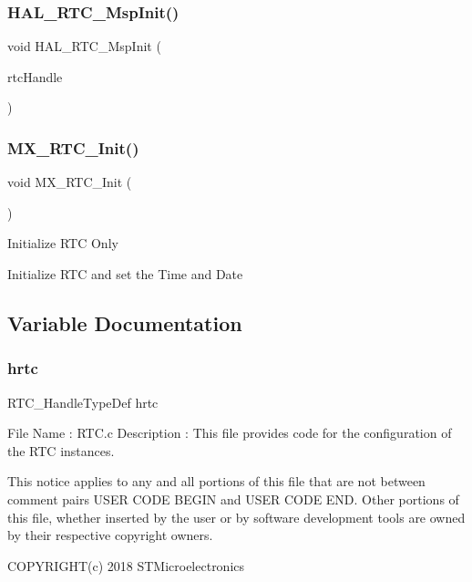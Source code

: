 \subsubsection{H\+A\+L\+\_\+\+R\+T\+C\+\_\+\+Msp\+Init()}
{\footnotesize\ttfamily void H\+A\+L\+\_\+\+R\+T\+C\+\_\+\+Msp\+Init (\begin{DoxyParamCaption}\item[{R\+T\+C\+\_\+\+Handle\+Type\+Def $\ast$}]{rtc\+Handle }\end{DoxyParamCaption})}

\mbox{\label{rtc_8c_abf4accd1ce479030808e546f3d4642c9}} 
\subsubsection{M\+X\+\_\+\+R\+T\+C\+\_\+\+Init()}
{\footnotesize\ttfamily void M\+X\+\_\+\+R\+T\+C\+\_\+\+Init (\begin{DoxyParamCaption}\item[{void}]{ }\end{DoxyParamCaption})}

Initialize R\+TC Only

Initialize R\+TC and set the Time and Date

\subsection{Variable Documentation}
\mbox{\label{rtc_8c_aa0c7fca836406ade332e1e3f1039d8ab}} 
\subsubsection{hrtc}
{\footnotesize\ttfamily R\+T\+C\+\_\+\+Handle\+Type\+Def hrtc}

File Name \+: R\+T\+C.\+c Description \+: This file provides code for the configuration of the R\+TC instances.

This notice applies to any and all portions of this file that are not between comment pairs U\+S\+ER C\+O\+DE B\+E\+G\+IN and U\+S\+ER C\+O\+DE E\+ND. Other portions of this file, whether inserted by the user or by software development tools are owned by their respective copyright owners.

C\+O\+P\+Y\+R\+I\+G\+H\+T(c) 2018 S\+T\+Microelectronics

